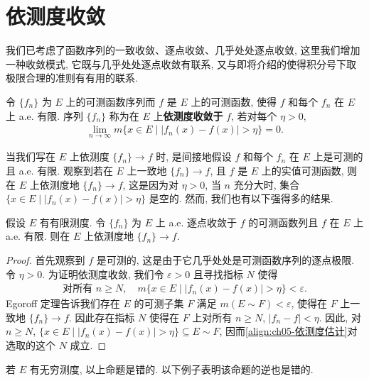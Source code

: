 \documentclass[../../main.tex]{subfiles}
\begin{document}
\section{依测度收敛}\label{section:ch05-依测度收敛}

我们已考虑了函数序列的一致收敛、逐点收敛、几乎处处逐点收敛, 这里我们增加一种收敛模式, 它既与几乎处处逐点收敛有联系, 又与即将介绍的使得积分号下取极限合理的准则有有用的联系.

\begin{definition}[依测度收敛]\label{definition:ch05-依测度}
令 $\{f_{n}\}$ 为 $E$ 上的可测函数序列而 $f$ 是 $E$ 上的可测函数, 使得 $f$ 和每个 $f_{n}$ 在 $E$ 上 a.e. 有限. 序列 $\{f_{n}\}$ 称为在 $E$ 上\textbf{依测度收敛于} $f$, 若对每个 $\eta>0$,
\begin{align*}
\lim_{n\to\infty}m\{x\in E\mid|f_{n}(x)-f(x)|>\eta\}=0.
\end{align*}
\end{definition}

当我们写在 $E$ 上依测度 $\{f_{n}\}\to f$ 时, 是间接地假设 $f$ 和每个 $f_{n}$ 在 $E$ 上是可测的且 a.e. 有限. 观察到若在 $E$ 上一致地 $\{f_{n}\}\to f$, 且 $f$ 是 $E$ 上的实值可测函数, 则在 $E$ 上依测度地 $\{f_{n}\}\to f$, 这是因为对 $\eta>0$, 当 $n$ 充分大时, 集合 $\{x\in E\mid|f_{n}(x)-f(x)|>\eta\}$ 是空的. 然而, 我们也有以下强得多的结果.

\begin{proposition}\label{proposition:ch05-有限测度a.e.依测度}
假设 $E$ 有有限测度. 令 $\{f_{n}\}$ 为 $E$ 上 a.e. 逐点收敛于 $f$ 的可测函数列且 $f$ 在 $E$ 上 a.e. 有限. 则在 $E$ 上依测度地 $\{f_{n}\}\to f$.
\end{proposition}

\begin{proof}
首先观察到 $f$ 是可测的, 这是由于它几乎处处是可测函数序列的逐点极限. 令 $\eta>0$. 为证明依测度收敛, 我们令 $\varepsilon>0$ 且寻找指标 $N$ 使得
\begin{align}
\text{对所有 }n\geqslant N,\quad m\{x\in E\mid|f_{n}(x)-f(x)|>\eta\}<\varepsilon.\label{align:ch05-依测度估计}
\end{align}
Egoroff 定理告诉我们存在 $E$ 的可测子集 $F$ 满足 $m(E\sim F)<\varepsilon$, 使得在 $F$ 上一致地 $\{f_{n}\}\to f$. 因此存在指标 $N$ 使得在 $F$ 上对所有 $n\geqslant N$, $|f_{n}-f|<\eta$. 因此, 对 $n\geqslant N$, $\{x\in E\mid|f_{n}(x)-f(x)|>\eta\}\subseteq E\sim F$, 因而\eqref{align:ch05-依测度估计}对选取的这个 $N$ 成立.
\end{proof}

若 $E$ 有无穷测度, 以上命题是错的. 以下例子表明该命题的逆也是错的.
\end{document}
